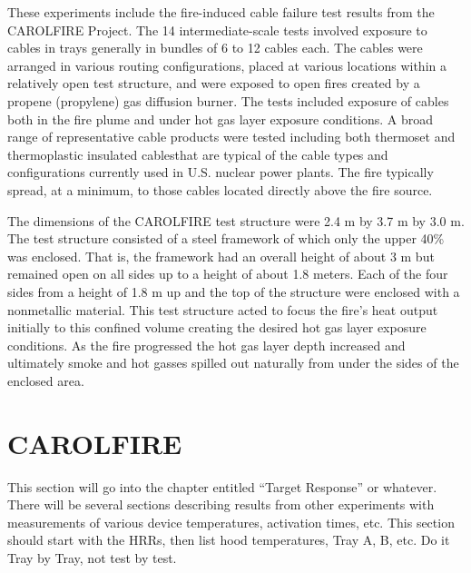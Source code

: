 \documentclass[11pt]{book}
\begin{document}

These experiments include the fire-induced cable failure test results
from the CAROLFIRE Project. The 14 intermediate-scale tests involved
exposure to cables in trays generally in bundles of 6 to 12 cables each. The
cables were arranged in various routing configurations, placed at various
locations within a relatively open test structure, and were exposed to
open fires created by a propene (propylene) gas diffusion burner. The
tests included exposure of cables both in the fire plume and under
hot gas layer exposure conditions. A broad range of representative
cable products were tested including both thermoset and thermoplastic
insulated cablesthat are typical of the cable types and configurations
currently used in U.S. nuclear power plants. The fire typically spread,
at a minimum, to those cables located directly above the fire source.

The dimensions of the CAROLFIRE test structure were
2.4 m by 3.7 m by 3.0 m. The test structure consisted of
a steel framework of which only the upper 40\% was enclosed.
That is, the framework had an overall height of about 3 m
but remained open on all sides up to a height of about 1.8 meters.
Each of the four sides from a height of 1.8 m up and
the top of the structure were enclosed with a nonmetallic
material. This test structure acted to focus the fire's heat output
initially to this confined volume creating the desired hot gas layer
exposure conditions. As the fire progressed the hot gas layer depth
increased and ultimately smoke and hot gasses spilled out naturally
from under the sides of the enclosed area.






\clearpage


\section{CAROLFIRE}

This section will go into the chapter entitled ``Target Response'' or whatever. There will be several sections
describing results from other experiments with measurements of various device temperatures, activation times,
etc. This section should start with the HRRs, then list hood temperatures, Tray A, B, etc. Do it Tray by Tray, not
test by test.
\end{document}
